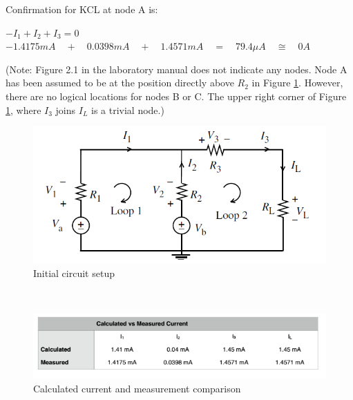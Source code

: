 \documentclass[12pt]{article}
\begin{document}
Confirmation for KCL at node A is:
\begin{center}
	$-{ I }_{ 1 }+{ I }_{ 2 }+{ I }_{ 3 }=0$\\
	$-1.4175mA\quad +\quad 0.0398mA\quad +\quad 1.4571mA\quad =\quad 79.4\mu A\quad \cong \quad 0A$\\[1em]
\end{center}

(Note: Figure 2.1 in 
the laboratory manual does not indicate any nodes. Node A has been assumed to be at the 
position directly above ${R}_{2}$ in Figure \ref{fig.setup}. However, there are no logical locations for nodes B or 
C. The upper right corner of Figure \ref{fig.setup}, where ${I}_{3}$ joins ${I}_{L}$ is a trivial node.)
\begin{figure}[htbp]
\centering
\includegraphics[scale=0.8]{Fig_2_1.png}
\caption{Initial circuit setup}
\label{fig.setup}
\end{figure}\\
\begin{figure}[htbp]
	\centering
	\includegraphics[scale=1]{CurrentLawMeasurement.png}
	\caption{Calculated current and measurement comparison}
	\label{fig.Current}
\end{figure}
\end{document}
